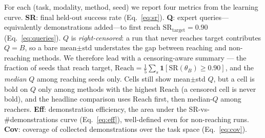 \documentclass[letterpaper]{article} %
\begin{document}
For each (task, modality, method, seed) we report four metrics from the learning
curve. \textbf{SR}: final held-out success rate (Eq.~\ref{eq:sr}). \textbf{Q}: expert
queries---equivalently demonstrations added---to first reach
$\mathrm{SR}_\mathrm{target}=0.90$ (Eq.~\ref{eq:queries}). $Q$ is
\emph{right-censored}: a run that never reaches target contributes $Q=B$, so a bare
mean$\pm$std understates the gap between reaching and non-reaching methods. We
therefore lead with a censoring-aware summary --- the fraction of seeds that reach
target, $\mathrm{Reach}=\tfrac15\sum_{s}\mathbf{1}[\mathrm{SR}(\theta_B)\ge0.90]$, and
the \emph{median} $Q$ among reaching seeds only. Cells still show mean$\pm$std $Q$,
but a cell is bold on $Q$ only among methods with the highest $\mathrm{Reach}$ (a
censored cell is never bold), and the headline comparison uses Reach first, then
median-$Q$ among reachers. \textbf{Eff}: demonstration efficiency, the area under the
SR-vs-\#demonstrations curve (Eq.~\ref{eq:eff}), well-defined even for non-reaching
runs. \textbf{Cov}: coverage of collected demonstrations over the task space
(Eq.~\ref{eq:cov}).
\end{document}
